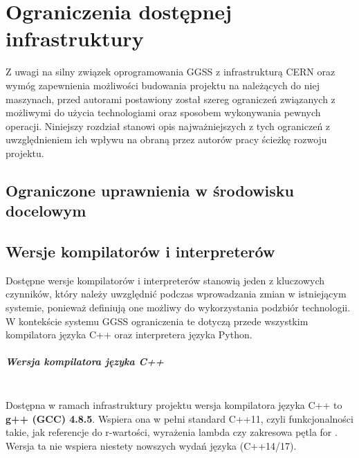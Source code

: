 
\chapter{Ograniczenia dostępnej infrastruktury}
\label{cha:ogra}
Z uwagi na silny związek oprogramowania GGSS z infrastrukturą CERN oraz wymóg zapewnienia możliwości budowania projektu na należących do niej maszynach, przed autorami postawiony został szereg ograniczeń związanych z możliwymi do użycia technologiami oraz sposobem wykonywania pewnych operacji. Niniejszy rozdział stanowi opis najważniejszych z tych ograniczeń z uwzględnieniem ich wpływu na obraną przez autorów pracy ścieżkę rozwoju projektu.


\section{Ograniczone uprawnienia w środowisku docelowym}


\section{Wersje kompilatorów i interpreterów}
Dostępne wersje kompilatorów i interpreterów stanowią jeden z kluczowych czynników, który należy uwzględnić podczas wprowadzania zmian w istniejącym systemie, ponieważ definiują one możliwy do wykorzystania podzbiór technologii. W kontekście systemu GGSS ograniczenia te dotyczą przede wszystkim kompilatora języka C++ oraz interpretera języka Python. 

\paragraph*{Wersja kompilatora języka C++}\mbox{}\\
Dostępna w ramach infrastruktury projektu wersja kompilatora języka C++ to \textbf{g++ (GCC) 4.8.5}. Wspiera ona w pełni standard C++11, czyli funkcjonalności takie, jak referencje do r-wartości, wyrażenia lambda czy zakresowa pętla for \cite{GCC48}. Wersja ta nie wspiera niestety nowszych wydań języka (C++14/17).

